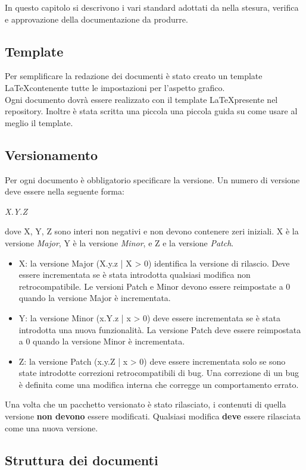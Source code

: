 In questo capitolo si descrivono i vari standard adottati da \GRUPPO nella stesura, verifica e approvazione della documentazione da produrre.
\subsection{Template}
Per semplificare la redazione dei documenti è stato creato un template \LaTeX contenente tutte le impostazioni per l'aspetto grafico. \\
Ogni documento dovrà essere realizzato con il template \LaTeX presente nel \gls{repository}. Inoltre è stata scritta una piccola una piccola guida su come usare al meglio il template.
\subsection{Versionamento}
Per ogni documento è obbligatorio specificare la versione. Un numero di versione deve essere nella seguente forma:
\begin{center}
	\emph{X.Y.Z}
\end{center}
dove X, Y, Z sono interi non negativi e non devono contenere zeri iniziali. X è la versione \textit{Major}, Y è la versione \textit{Minor}, e Z e la versione \textit{Patch}.
\begin{itemize}
	\item X: la versione Major (X.y.z | X > 0) identifica la versione di rilascio. Deve essere incrementata se è stata introdotta qualsiasi modifica non retrocompatibile. Le versioni Patch e Minor devono essere reimpostate a 0 quando la versione Major è incrementata. 
	\item Y: la versione Minor (x.Y.z | x > 0) deve essere incrementata se è stata introdotta una nuova funzionalità. La versione Patch deve essere reimpostata a 0 quando la versione Minor è incrementata.
	\item Z: la versione Patch (x.y.Z | x > 0) deve essere incrementata solo se sono state introdotte correzioni retrocompatibili di bug. Una correzione di un bug è definita come una modifica interna che corregge un comportamento errato.
\end{itemize}
Una volta che un pacchetto versionato è stato rilasciato, i contenuti di quella versione \textbf{non devono} essere modificati. Qualsiasi modifica \textbf{deve} essere rilasciata come una nuova versione.

\subsection{Struttura dei documenti}
